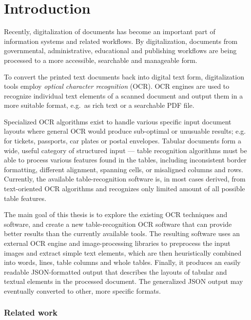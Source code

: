 \chapter*{Introduction}

Recently, digitalization of documents has become an important part of information systems and related workflows. By digitalization, documents from governmental, administrative, educational and publishing workflows are being processed to a more accessible, searchable and manageable form.

To convert the printed text documents back into digital text form, digitalization tools employ \emph{optical character recognition} (OCR). OCR engines are used to recognize individual text elements of a scanned document and output them in a more suitable format, e.g.~as rich text or a searchable PDF file.

Specialized OCR algorithms exist to handle various specific input document layouts where general OCR would produce sub-optimal or unusuable results; e.g. for tickets, passports, car plates or postal envelopes. Tabular documents form a wide, useful category of structured input --- table recognition algorithms must be able to process various features found in the tables, including inconsistent border formatting, different alignment, spanning cells, or misaligned columns and rows. Currently, the available table-recognition software is, in most cases derived, from text-oriented OCR algorithms and recognizes only limited amount of all possible table features.

The main goal of this thesis is to explore the existing OCR techniques and software, and create a new table-recognition OCR software that can provide better results than the currently available tools. The resulting software uses an external OCR engine and image-processing libraries to preprocess the input images and extract simple text elements, which are then heuristically combined into words, lines, table columns and whole tables. Finally, it produces an easily readable JSON-formatted output that describes the layouts of tabular and textual elements in the processed document. The generalized JSON output may eventually converted to other, more specific formats.

\subsection*{Related work}

